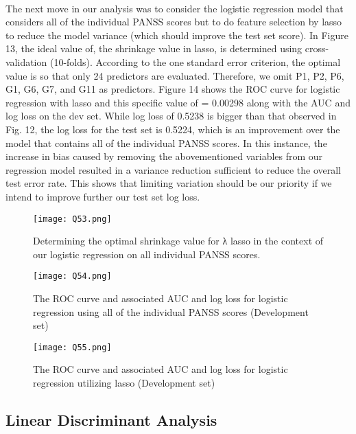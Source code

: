 \documentclass{article}
\begin{document}
 	\paragraph{}The next move in our analysis was to consider the logistic regression model that considers all of the individual PANSS scores but to do feature selection by lasso to reduce the model variance (which should improve the test set score). In Figure 13, the ideal value of, the shrinkage value in lasso, is determined using cross-validation (10-folds). According to the one standard error criterion, the optimal value is so that only 24 predictors are evaluated. Therefore, we omit P1, P2, P6, G1, G6, G7, and G11 as predictors. Figure 14 shows the ROC curve for logistic regression with lasso and this specific value of = 0.00298 along with the AUC and log loss on the dev set. While log loss of 0.5238 is bigger than that observed in Fig. 12, the log loss for the test set is 0.5224, which is an improvement over the model that contains all of the individual PANSS scores. In this instance, the increase in bias caused by removing the abovementioned variables from our regression model resulted in a variance reduction sufficient to reduce the overall test error rate. This shows that limiting variation should be our priority if we intend to improve further our test set log loss.
 
 \begin{figure}[H] 
\centering %
\texttt{[image: Q53.png]} 
\caption{Determining the optimal shrinkage value for λ lasso in the context of our logistic regression on all individual PANSS scores.}
\label{R} %
\end{figure} 

 \begin{figure}[H] 
\centering %
\texttt{[image: Q54.png]} 
\caption{The ROC curve and associated AUC and log loss for logistic regression using all of the individual PANSS scores (Development set)}
\label{R} %
\end{figure} 

 \begin{figure}[H] 
\centering %
\texttt{[image: Q55.png]} 
\caption{The ROC curve and associated AUC and log loss for logistic regression utilizing lasso (Development set)}
\label{R} %
\end{figure} 


 	\subsection{Linear Discriminant Analysis}
\end{document}
